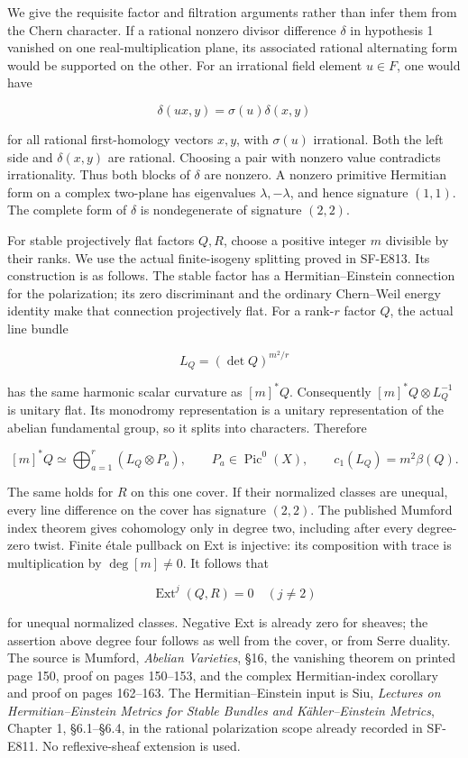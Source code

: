 We give the requisite factor and filtration arguments rather than infer
them from the Chern character. If a rational nonzero divisor difference
\(\delta\) in hypothesis 1 vanished on one real-multiplication plane,
its associated rational alternating form would be supported on the
other. For an irrational field element \(u\in F\), one would have

\[
 \delta(ux,y)=\sigma(u)\delta(x,y)
\]

for all rational first-homology vectors \(x,y\), with \(\sigma(u)\)
irrational. Both the left side and \(\delta(x,y)\) are rational.
Choosing a pair with nonzero value contradicts irrationality. Thus both
blocks of \(\delta\) are nonzero. A nonzero primitive Hermitian form on
a complex two-plane has eigenvalues \(\lambda,-\lambda\), and hence
signature \((1,1)\). The complete form of \(\delta\) is nondegenerate of
signature \((2,2)\).

For stable projectively flat factors \(Q,R\), choose a positive integer
\(m\) divisible by their ranks. We use the actual finite-isogeny
splitting proved in SF-E813. Its construction is as follows. The stable
factor has a Hermitian--Einstein connection for the polarization; its
zero discriminant and the ordinary Chern--Weil energy identity make that
connection projectively flat. For a rank-\(r\) factor \(Q\), the actual
line bundle

\[
 L_Q=(\det Q)^{m^2/r}
\]

has the same harmonic scalar curvature as \([m]^*Q\). Consequently
\([m]^*Q\otimes L_Q^{-1}\) is unitary flat. Its monodromy representation
is a unitary representation of the abelian fundamental group, so it
splits into characters. Therefore

\[
 [m]^*Q\simeq\bigoplus_{a=1}^{r}(L_Q\otimes P_a),
 \qquad P_a\in\operatorname{Pic}^0(X),
 \qquad c_1(L_Q)=m^2\beta(Q).
 \tag{E816.4}
\]

The same holds for \(R\) on this one cover. If their normalized classes
are unequal, every line difference on the cover has signature \((2,2)\).
The published Mumford index theorem gives cohomology only in degree two,
including after every degree-zero twist. Finite étale pullback on Ext is
injective: its composition with trace is multiplication by
\(\deg[m]\ne0\). It follows that

\[
 \operatorname{Ext}^j(Q,R)=0\quad(j\ne2)
 \tag{E816.5}
\]

for unequal normalized classes. Negative Ext is already zero for
sheaves; the assertion above degree four follows as well from the cover,
or from Serre duality. The source is Mumford, \emph{Abelian Varieties},
§16, the vanishing theorem on printed page 150, proof on pages 150--153,
and the complex Hermitian-index corollary and proof on pages 162--163.
The Hermitian--Einstein input is Siu, \emph{Lectures on
Hermitian--Einstein Metrics for Stable Bundles and Kähler--Einstein
Metrics}, Chapter 1, §6.1--§6.4, in the rational polarization scope
already recorded in SF-E811. No reflexive-sheaf extension is used.

